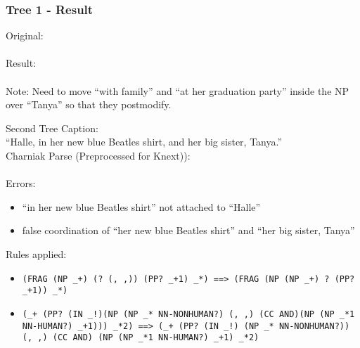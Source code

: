 \begin{frame}[fragile] 
  \frametitle{Tree 1 - Result}
  Original:\\
  \\


  Result:\\
  \\
  Note: Need to move ``with family'' and ``at her graduation party'' inside the NP over ``Tanya'' so that they postmodify. 

\end{frame}
\begin{frame} {Second Tree}
  Caption:\\
  ``Halle, in her new blue Beatles shirt, and her big sister, Tanya.''\\
  Charniak Parse (Preprocessed for Knext)):\\
  \\

  Errors:\\
  \begin{itemize}
  \item ``in her new blue Beatles shirt'' not attached to ``Halle''
  \item false coordination of ``her new blue Beatles shirt'' and ``her big sister, Tanya''
  \end{itemize}

  Rules applied:\\
  \begin{itemize}
  \item \texttt{(FRAG (NP \_+) (? (, ,)) (PP? \_+1) \_*) ==> (FRAG (NP (NP \_+) ? (PP? \_+1)) \_*)}
  \item \texttt{(\_+ (PP? (IN \_!)(NP (NP \_* NN-NONHUMAN?) (, ,) (CC AND)(NP (NP \_*1 NN-HUMAN?) \_+1)))     \_*2) ==> (\_+ (PP? (IN \_!) (NP \_* NN-NONHUMAN?)) (, ,) (CC AND)  (NP (NP \_*1 NN-HUMAN?) \_+1) \_*2)}
  \end{itemize}
\end{frame} 
